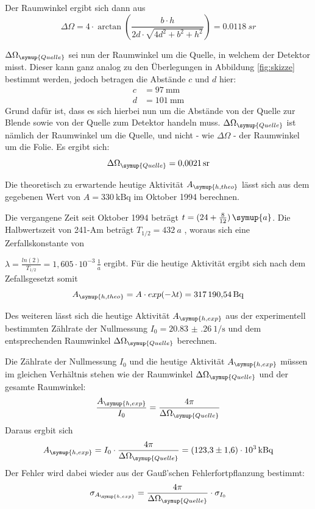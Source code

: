 Der Raumwinkel ergibt sich dann aus \cite{sample2}
\begin{equation}
  \Delta \Omega = 4 \cdot \arctan\left(\frac{b \cdot h}{2d \cdot \sqrt{4d^2 + b^2 + h^2}}\right) = \SI{0.0118}{sr}
\end{equation}

$\Delta \Omega_{\symup{Quelle}}$ sei nun der Raumwinkel um die Quelle, in welchem der Detektor misst.
Dieser kann ganz analog zu den Überlegungen in Abbildung \ref{fig:skizze} bestimmt werden, jedoch betragen die
Abstände $c$ und $d$ hier:
\begin{align*}
  c &= \SI{97}{\milli\meter} \\
  d &= \SI{101}{\milli\meter}
\end{align*}
Grund dafür ist, dass es sich hierbei nun um die Abstände von der Quelle zur Blende
sowie von der Quelle zum Detektor handeln muss. $\Delta \Omega_{\symup{Quelle}}$ ist nämlich
der Raumwinkel um die Quelle, und nicht - wie $\Delta \Omega$ - der Raumwinkel um die Folie.
Es ergibt sich:
\begin{equation*}
  \Delta \Omega_{\symup{Quelle}} = \SI{0.0021}{sr}
\end{equation*}

Die theoretisch zu erwartende heutige Aktivität $A_{\symup{h,theo}}$ lässt sich aus dem gegebenen Wert von
$A = \SI{330}{\kilo\becquerel}$ \cite{sample1} im Oktober 1994 berechnen.

Die vergangene Zeit seit Oktober 1994 beträgt $t= (24 + \frac{8}{12})\,\symup{a}$.
Die Halbwertszeit von 241-Am beträgt $T_{1/2} = \SI{432}{a}$ \cite{sample8}, woraus sich eine
Zerfallskonstante von

$\lambda = \frac{ln(2)}{T_{1/2}} = 1,605 \cdot 10^{-3} \, \frac{1}{a}$ ergibt.
Für die heutige Aktivität ergibt sich nach dem Zefallsgesetzt somit
\begin{equation*}
  A_{\symup{h,theo}} = A \cdot exp(-\lambda t) = \SI{317190.54}{\becquerel}
\end{equation*}

Des weiteren lässt sich die heutige Aktivität $A_{\symup{h,exp}}$ aus der experimentell bestimmten
Zählrate der Nullmessung $I_0 = \SI{20.83(26)}{1\per\second}$ und dem entsprechenden Raumwinkel $\Delta \Omega_{\symup{Quelle}}$ berechnen.

Die Zählrate der Nullmessung $I_0$ und die heutige Aktivität $A_\symup{h,exp}$ müssen im gleichen
Verhältnis stehen wie der Raumwinkel $\Delta \Omega_{\symup{Quelle}}$ und der gesamte Raumwinkel:
\begin{equation*}
  \frac{A_\symup{h,exp}}{I_0} = \frac{4\pi}{\Delta \Omega_{\symup{Quelle}}}
\end{equation*}
Daraus ergbit sich
\begin{equation*}
  A_\symup{h,exp} = I_0 \cdot \frac{4\pi}{\Delta \Omega_{\symup{Quelle}}} = \SI{123.3(16)e3}{\kilo\becquerel}
\end{equation*}
Der Fehler wird dabei wieder aus der Gauß'schen Fehlerfortpflanzung bestimmt:
\begin{equation*}
  \sigma_{A_\symup{h,exp}} = \frac{4\pi}{\Delta \Omega_{\symup{Quelle}}} \cdot \sigma_{I_0}
\end{equation*}



